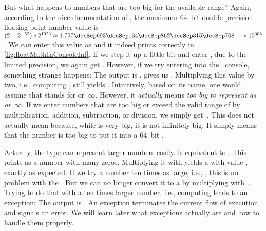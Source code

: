 But what happens to numbers that are too big for the available range?
Again, according to the nice documentation of , the maximum 64~bit double precision floating point number value is~$(2-2^{-52})*2^{1023}\approx1.797\decSep693\decSep134\decSep862\decSep315\decSep708\dots*10^{308}$.
We can enter this value as  and it indeed prints correctly in \cref{fig:floatMathInConsoleInf}.
If we step it up a little bit and enter , due to the limited precision, we again get .
However, if we try entering  into the \python\ console, something strange happens:
The output is .
 gives us .
Multiplying this value by two, i.e., computing , still yields .
Intuitively, based on its name, one would assume that  stands for  or~$\infty$.
However, it \emph{actually} means \emph{too big to represent as  or~$\infty$}.
If we enter numbers that are too big or exceed the valid range of  by multiplication, addition, subtraction, or division, we simply get~.
This does not actually mean  because, while  is very big, it is not infinitely big.
It simply means that the number is too big to put it into a 64~bit .

Actually, the  type can represent larger numbers easily.
 is equivalent to .
This prints as a number with many zeros.
Multiplying it with  yields a  with value , exactly as expected.
If we try a number ten times as large, i.e., , this is no problem with the .
But we can no longer convert it to a  by multiplying with~.
Trying to do that with a ten times larger number, i.e., computing  leads to an exception:
The output is .
An exception terminates the current flow of execution and signals an error.
We will learn later what exceptions actually are and how to handle them properly.


